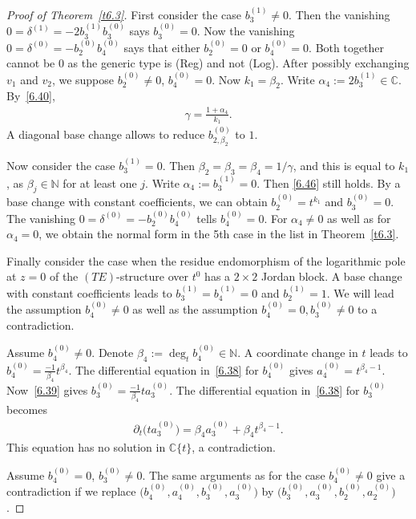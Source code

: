 \documentclass[10pt,a4paper]{amsart}
\numberwithin{equation}{section}
\numberwithin{figure}{section}
\newcommand{\N}{{\mathbb N}}
\newcommand{\C}{{\mathbb C}}
\newcommand{\paa}{\partial}
\begin{document}
\begin{proof}[Proof of Theorem~\ref{t6.3}]
First consider the case $b_3^{(1)}\neq 0$. Then
the vanishing $0=\delta^{(1)}=-2b_3^{(1)}b_3^{(0)}$
says $b_3^{(0)}=0$. Now the vanishing
$0=\delta^{(0)}=-b_2^{(0)}b_4^{(0)}$ says that either
$b_2^{(0)}=0$ or $b_4^{(0)}=0$. Both together cannot be
0 as the generic type is (Reg) and not (Log).
After possibly exchanging $v_1$ and $v_2$, we suppose
$b_2^{(0)}\neq 0$, $b_4^{(0)}=0$. Now $k_1=\beta_2$.
Write $\alpha_4:=2b_3^{(1)}\in\C$.
By~\eqref{6.40},
\begin{eqnarray}\label{6.46}
\gamma=\frac{1+\alpha_4}{k_1}.
\end{eqnarray}
A diagonal base change allows to reduce $b_{2,\beta_2}^{(0)}$
to $1$.

Now consider the case $b_3^{(1)}=0$.
Then $\beta_2=\beta_3=\beta_4=1/\gamma$, and this is
equal to $k_1$, as $\beta_j\in\N$ for at least one $j$.
Write $\alpha_4:=b_3^{(1)}=0$. Then
\eqref{6.46} still holds.
By a base change with constant coefficients, we can obtain
$b_2^{(0)}=t^{k_1}$ and $b_3^{(0)}=0$.
The vanishing $0=\delta^{(0)}=-b_2^{(0)}b_4^{(0)}$
tells $b_4^{(0)}=0$.
For $\alpha_4\neq 0$ as well as for $\alpha_4=0$,
we obtain the normal form in the 5th case in the list
in Theorem~\ref{t6.3}.

Finally consider the case when the residue endomorphism
of the logarithmic pole at $z=0$ of the $(TE)$-structure
over $t^0$ has a $2\times 2$ Jordan block.
A base change with constant coefficients leads to
$b_3^{(1)}=b_4^{(1)}=0$ and $b_2^{(1)}=1$.
We will lead the assumption $b_4^{(0)}\neq 0$ as well as the
assumption $b_4^{(0)}=0,b_3^{(0)}\neq 0$ to a contradiction.

{\samepage
Assume $b_4^{(0)}\neq 0$.
Denote $\beta_4:=\deg_t b_4^{(0)}\in\N$.
A coordinate change in $t$ leads to
$b_4^{(0)}=\frac{-1}{\beta_4}t^{\beta_4}$.
The differential equation in~\eqref{6.38} for $b_4^{(0)}$
gives $a_4^{(0)}=t^{\beta_4-1}$.
Now~\eqref{6.39} gives $b_3^{(0)}=\frac{-1}{\beta_4}ta_3^{(0)}$.
The differential equation
in~\eqref{6.38} for $b_3^{(0)}$ becomes
\begin{gather*}
\paa_t \big(ta_3^{(0)}\big)= \beta_4 a_3^{(0)}+\beta_4 t^{\beta_4-1}.
\end{gather*}
This equation has no solution in $\C\{t\}$, a contradiction.

}

Assume $b_4^{(0)}=0$, $b_3^{(0)}\neq 0$.
The same arguments as for the case $b_4^{(0)}\neq 0$
give a contradiction if we replace
$\big(b_4^{(0)},a_4^{(0)},b_3^{(0)},a_3^{(0)}\big)$ by
$\big(b_3^{(0)},a_3^{(0)},b_2^{(0)},a_2^{(0)}\big)$.


\end{proof}
\end{document}
